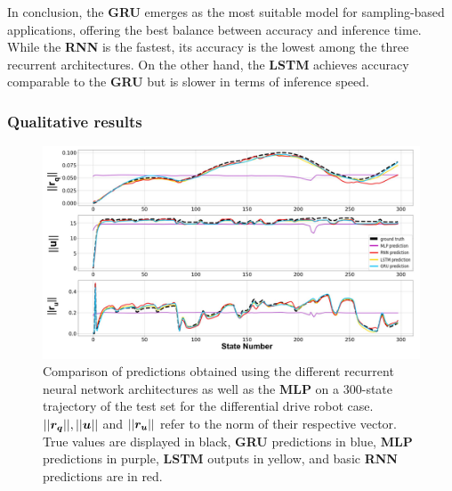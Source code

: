 In conclusion, the \textbf{GRU} emerges as the most suitable model for sampling-based applications, offering the best balance between accuracy and inference time. 
While the \textbf{RNN} is the fastest, its accuracy is the lowest among the three recurrent architectures. 
On the other hand, the \textbf{LSTM} achieves accuracy comparable to the \textbf{GRU} but is slower in terms of inference speed.



\subsubsection{Qualitative results}

\begin{figure}[t]
    \centering
    \includegraphics[width=0.99\linewidth]{figures/learning_unic/all_models_labeled.jpg} 
    \caption{Comparison of predictions obtained using the different recurrent neural network architectures as well as the \textbf{MLP} on a 300-state trajectory of the test set for the differential drive robot case. 
    $||\boldsymbol{r_q}||, ||\boldsymbol{u}||$ and $||\boldsymbol{r_u}||$ refer to the norm of their respective vector. 
    True values are displayed in black, \textbf{GRU} predictions in blue, \textbf{MLP} predictions in purple, \textbf{LSTM} outputs in yellow, and basic \textbf{RNN} predictions are in red.}
    \label{fig:all_models_pred_val_unic}
\end{figure}

